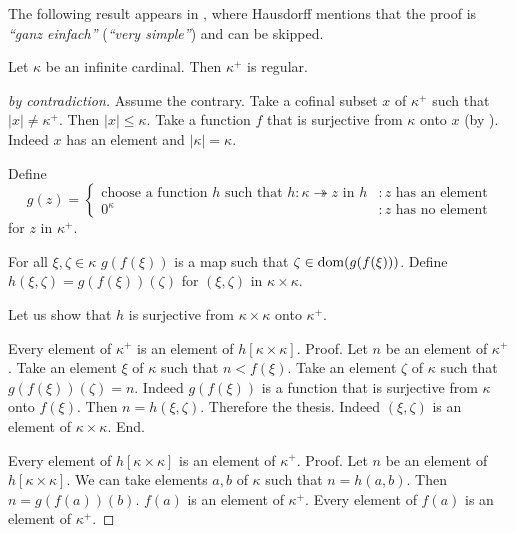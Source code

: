 \documentclass[english]{article}
\newcommand{\surjects}{\twoheadrightarrow}
\begin{document}
  The following result appears in \cite[p.~443]{Hausdorff1908},
  where Hausdorff mentions that the proof is
  \textit{``ganz einfach''} (\textit{``very simple''}) and can be skipped.

  \begin{forthel}
    \begin{theorem}[Hausdorff]
      Let $\kappa$ be an infinite cardinal.
      Then $\kappa^{+}$ is regular.
    \end{theorem}
    \begin{proof}[by contradiction]
      Assume the contrary.
      Take a cofinal subset $x$ of $\kappa^{+}$ such that $|x| \neq \kappa^{+}$.
      Then $|x| \leq \kappa$.
      Take a function $f$ that is surjective from $\kappa$ onto $x$ (by
      ).
      Indeed $x$ has an element and $|\kappa| = \kappa$.

      Define \[ g(z) =
        \begin{cases}
          \text{choose a function $h$ such that $h : \kappa \surjects z$ in $h$}
          & : \text{$z$ has an element}
          \\
          \text{$0^{\kappa}$}
          & : \text{$z$ has no element}
        \end{cases}
      \] for $z$ in $\kappa^{+}$.

      For all $\xi, \zeta \in \kappa$ $g(f(\xi))$ is a map such that $\zeta \in
      \operatorname{dom}(g(f(\xi)))$.
      Define $h(\xi,\zeta) = g(f(\xi))(\zeta)$ for $(\xi,\zeta)$ in $\kappa
      \times \kappa$.

      Let us show that $h$ is surjective from $\kappa \times \kappa$ onto
      $\kappa^{+}$.

        Every element of $\kappa^{+}$ is an element of $h[\kappa \times
        \kappa]$. \newline
        Proof.
          Let $n$ be an element of $\kappa^{+}$.
          Take an element $\xi$ of $\kappa$ such that $n < f(\xi)$.
          Take an element $\zeta$ of $\kappa$ such that $g(f(\xi))(\zeta) = n$.
          Indeed $g(f(\xi))$ is a function that is surjective from $\kappa$ onto
          $f(\xi)$.
          Then $n = h(\xi,\zeta)$.
          Therefore the thesis.
          Indeed $(\xi,\zeta)$ is an element of $\kappa \times \kappa$.
        End.

        Every element of $h[\kappa \times \kappa]$ is an element of
        $\kappa^{+}$. \newline
        Proof.
          Let $n$ be an element of $h[\kappa \times \kappa]$.
          We can take elements $a, b$ of $\kappa$ such that $n = h(a,b)$.
          Then $n = g(f(a))(b)$.
          $f(a)$ is an element of $\kappa^{+}$.
          Every element of $f(a)$ is an element of $\kappa^{+}$.


\end{proof}
\end{forthel}
\end{document}
